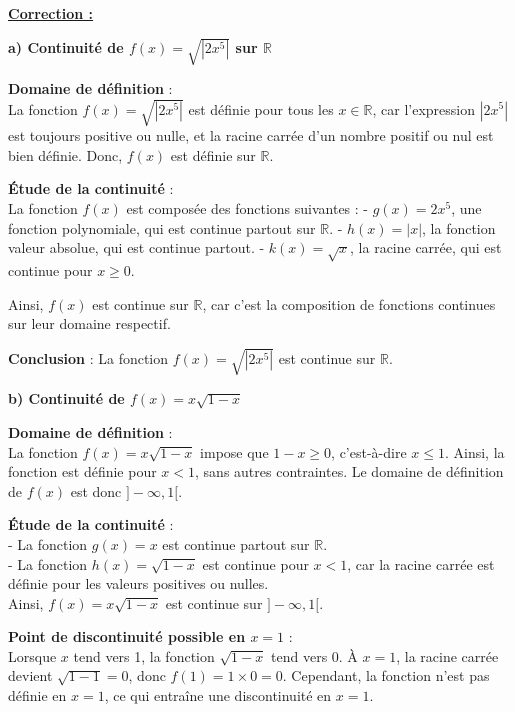 \documentclass[12pt]{article}
\newcounter{correction}
\newcommand{\correction}{%
  \refstepcounter{correction}%
  \textbf{\textcolor{myorange}{Correction \thecorrection :}} \ignorespaces
}
\begin{document}
\begin{enumerate}[label=\arabic*)]
		\textbf{\underline{\correction}}
		
\textbf{a) Continuité de \( f(x) = \sqrt{|2x^5|} \) sur \( \mathbb{R} \)}

\textbf{Domaine de définition} : \\
La fonction \( f(x) = \sqrt{|2x^5|} \) est définie pour tous les \( x \in \mathbb{R} \), car l’expression \( |2x^5| \) est toujours positive ou nulle, et la racine carrée d’un nombre positif ou nul est bien définie. Donc, \( f(x) \) est définie sur \( \mathbb{R} \).

\textbf{Étude de la continuité} : \\
La fonction \( f(x) \) est composée des fonctions suivantes :
- \( g(x) = 2x^5 \), une fonction polynomiale, qui est continue partout sur \( \mathbb{R} \).
- \( h(x) = |x| \), la fonction valeur absolue, qui est continue partout.
- \( k(x) = \sqrt{x} \), la racine carrée, qui est continue pour \( x \geq 0 \).

Ainsi, \( f(x) \) est continue sur \( \mathbb{R} \), car c’est la composition de fonctions continues sur leur domaine respectif.

\textbf{Conclusion} : La fonction \( f(x) = \sqrt{|2x^5|} \) est continue sur \( \mathbb{R} \).

\textbf{b) Continuité de \( f(x) = x\sqrt{1 - x} \)}

\textbf{Domaine de définition} : \\
La fonction \( f(x) = x\sqrt{1 - x} \) impose que \( 1 - x \geq 0 \), c'est-à-dire \( x \leq 1 \). Ainsi, la fonction est définie pour \( x < 1 \), sans autres contraintes. Le domaine de définition de \( f(x) \) est donc \( ]-\infty, 1[ \).

\textbf{Étude de la continuité} : \\
- La fonction \( g(x) = x \) est continue partout sur \( \mathbb{R} \). \\
- La fonction \( h(x) = \sqrt{1 - x} \) est continue pour \( x < 1 \), car la racine carrée est définie pour les valeurs positives ou nulles. \\
Ainsi, \( f(x) = x\sqrt{1 - x} \) est continue sur \( ]-\infty, 1[ \).

\textbf{Point de discontinuité possible en \( x = 1 \)} : \\
Lorsque \( x \) tend vers 1, la fonction \( \sqrt{1 - x} \) tend vers 0. À \( x = 1 \), la racine carrée devient \( \sqrt{1 - 1} = 0 \), donc \( f(1) = 1 \times 0 = 0 \). Cependant, la fonction n'est pas définie en \( x = 1 \), ce qui entraîne une discontinuité en \( x = 1 \).


\end{enumerate}
\end{document}
